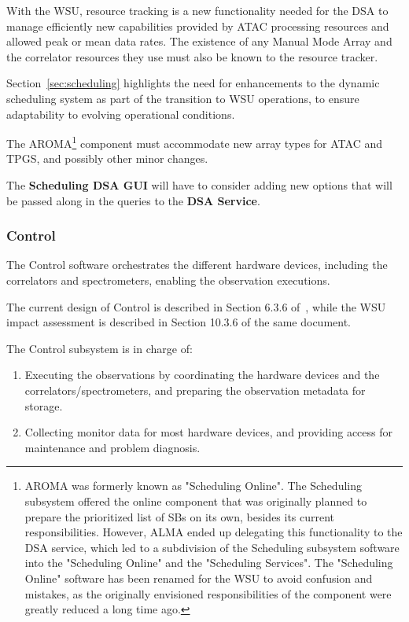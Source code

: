 With the WSU, resource tracking is a new functionality needed for the DSA to manage efficiently new capabilities provided by ATAC processing resources and allowed peak or mean data rates. The existence of any Manual Mode Array and the correlator resources they use must also be known to the resource tracker.

Section~\ref{sec:scheduling} highlights the need for enhancements to the dynamic scheduling system as part of the transition to WSU operations, to ensure adaptability to evolving operational conditions.

The AROMA\footnote{AROMA was formerly known as "Scheduling Online". The Scheduling subsystem offered the online component that was originally planned to prepare the prioritized list of SBs on its own, besides its current responsibilities. However, ALMA ended up delegating this functionality to the DSA service, which led to a subdivision of the Scheduling subsystem software into the "Scheduling Online" and the "Scheduling Services". The "Scheduling Online" software has been renamed for the WSU to avoid confusion and mistakes, as the originally envisioned responsibilities of the component were greatly reduced a long time ago.} component must accommodate new array types for ATAC and TPGS, and possibly other minor changes.

The \textbf{Scheduling DSA GUI} will have to consider adding new options that will be passed along in the queries to the \textbf{DSA Service}.

\subsubsection{Control}
\label{sec:control}
The Control software orchestrates the different hardware devices, including the correlators and spectrometers, enabling the observation executions.

The current design of Control is described in Section 6.3.6 of~\cite{CSA-IA}, while the WSU impact assessment is described in Section 10.3.6 of the same document.

The Control subsystem is in charge of:
\begin{enumerate}[itemsep=-0.5em]
    \item Executing the observations by coordinating the hardware devices and the correlators/spectrometers, and preparing the observation metadata for storage.
    \item Collecting monitor data for most hardware devices, and providing access for maintenance and problem diagnosis.
\end{enumerate}

